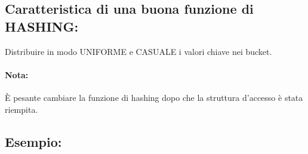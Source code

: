 \documentclass[a4paper, 10pt]{article}
\theoremstyle{definition}
\begin{document}
	\subsection*{Caratteristica di una buona funzione di HASHING:}
	
		Distribuire in modo UNIFORME e CASUALE i valori
		chiave nei bucket.
		
		\paragraph{Nota:} È pesante cambiare la funzione di hashing dopo
		che la struttura d'accesso è stata riempita.
		
		\vspace*{0.4cm}
		
	\subsection*{Esempio:}
\end{document}
